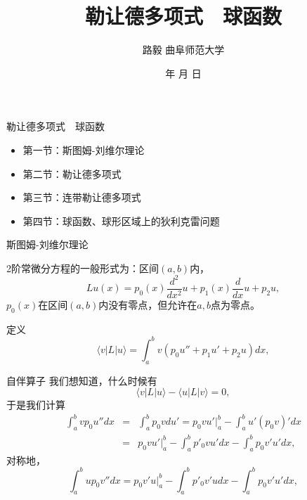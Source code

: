\documentclass[11pt]{beamer}
\begin{document}
	\author{ 路毅 \hspace{0.3cm} 曲阜师范大学 }
	\date{\number\year 年 \number\month 月 \number\day 日}
	\title{勒让德多项式　球函数}

\begin{frame}
	\maketitle
\end{frame}

\kaishu

\begin{frame}{勒让德多项式　球函数}
\begin{itemize}
	\item {\color{blue}第一节：斯图姆-刘维尔理论}
	\vspace{1cm}
	\item 第二节：勒让德多项式
	\vspace{1cm}
	\item 第三节：连带勒让德多项式
	\vspace{1cm}
	\item 第四节：球函数、球形区域上的狄利克雷问题
\end{itemize}
\end{frame}

\begin{frame}{斯图姆-刘维尔理论}

2阶常微分方程的一般形式为：区间$(a,b)$内，
\begin{equation}
L u(x) = p_0 (x) \frac{d^2}{dx^2} u + p_1(x) \frac{d}{dx} u + p_2 u,
\end{equation}
$p_0 (x)$在区间$(a,b)$内没有零点，但允许在$a,b$点为零点。

定义
\begin{equation}
\langle v | L | u \rangle = \int^b_a v ( p_0 u'' + p_1 u' + p_2 u ) dx,
\end{equation}
\end{frame}

\begin{frame}{自伴算子}
我们想知道，什么时候有
\begin{equation}
\langle v | L | u \rangle - \langle u | L | v \rangle = 0,
\end{equation}
于是我们计算
\begin{eqnarray}
\int^b_a vp_0 u'' dx &=& \int^b_a p_0 v du' = p_0 v u' |^b_a - \int^b_a u' (p_0 v)' dx \nonumber\\
&=& p_0 v u' |^b_a - \int^b_a p'_0 v u' dx - \int^b_a p_0 v' u' dx,
\end{eqnarray}
对称地，
\begin{equation}
\int^b_a u p_0 v'' dx = p_0 v'u |^b_a - \int^b_a p'_0 v'u dx - \int^b_a p_0 v'u' dx,
\end{equation}

\end{frame}
\end{document}
